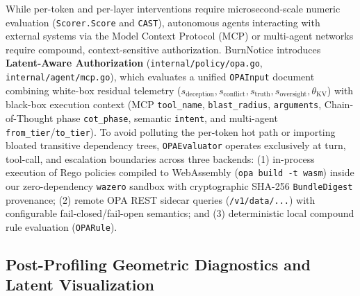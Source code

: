 \documentclass{article}
\begin{document}
While per-token and per-layer interventions require microsecond-scale numeric evaluation (\texttt{Scorer.Score} and \texttt{CAST}), autonomous agents interacting with external systems via the Model Context Protocol (MCP) or multi-agent networks require compound, context-sensitive authorization. BurnNotice introduces \textbf{Latent-Aware Authorization} (\texttt{internal/policy/opa.go}, \texttt{internal/agent/mcp.go}), which evaluates a unified \texttt{OPAInput} document combining white-box residual telemetry ($s_{\text{deception}}, s_{\text{conflict}}, s_{\text{truth}}, s_{\text{oversight}}, \theta_{\text{KV}}$) with black-box execution context (MCP \texttt{tool\_name}, \texttt{blast\_radius}, \texttt{arguments}, Chain-of-Thought phase \texttt{cot\_phase}, semantic \texttt{intent}, and multi-agent \texttt{from\_tier}/\texttt{to\_tier}). To avoid polluting the per-token hot path or importing bloated transitive dependency trees, \texttt{OPAEvaluator} operates exclusively at turn, tool-call, and escalation boundaries across three backends: (1) in-process execution of Rego policies compiled to WebAssembly (\texttt{opa build -t wasm}) inside our zero-dependency \texttt{wazero} sandbox with cryptographic SHA-256 \texttt{BundleDigest} provenance; (2) remote OPA REST sidecar queries (\texttt{/v1/data/...}) with configurable fail-closed/fail-open semantics; and (3) deterministic local compound rule evaluation (\texttt{OPARule}).

\subsection{Post-Profiling Geometric Diagnostics and Latent Visualization}\label{sec:analysis}
\end{document}
